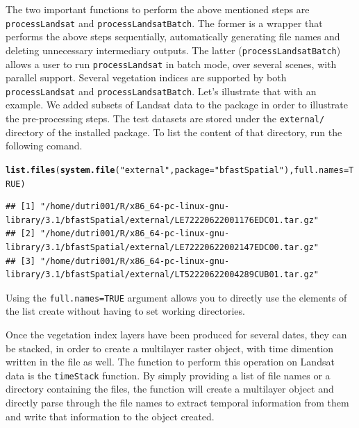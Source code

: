 \documentclass{article}\usepackage[]{graphicx}\usepackage[]{color}
\makeatletter
\newcommand{\hlnum}[1]{\textcolor[rgb]{0.686,0.059,0.569}{#1}}%
\newcommand{\hlstr}[1]{\textcolor[rgb]{0.192,0.494,0.8}{#1}}%
\newcommand{\hlstd}[1]{\textcolor[rgb]{0.345,0.345,0.345}{#1}}%
\newcommand{\hlkwc}[1]{\textcolor[rgb]{0.333,0.667,0.333}{#1}}%
\newcommand{\hlkwd}[1]{\textcolor[rgb]{0.737,0.353,0.396}{\textbf{#1}}}%
\newenvironment{kframe}{%
 \def\at@end@of@kframe{}%
 \ifinner\ifhmode%
  \def\at@end@of@kframe{\end{minipage}}%
  \begin{minipage}{\columnwidth}%
 \fi\fi%
 \def\FrameCommand##1{\hskip\@totalleftmargin \hskip-\fboxsep
 \colorbox{shadecolor}{##1}\hskip-\fboxsep
     \hskip-\linewidth \hskip-\@totalleftmargin \hskip\columnwidth}%
 \MakeFramed {\advance\hsize-\width
   \@totalleftmargin\z@ \linewidth\hsize
   \@setminipage}}%
 {\par\unskip\endMakeFramed%
 \at@end@of@kframe}
\newenvironment{knitrout}{}{} %
\def\code#1{\texttt{#1}}
\makeatother
\begin{document}
The two important functions to perform the above mentioned steps are \code{processLandsat} and \code{processLandsatBatch}. The former is a wrapper that performs the above steps sequentially, automatically generating file names and deleting unnecessary intermediary outputs. The latter (\code{processLandsatBatch}) allows a user to run \code{processLandsat} in batch mode, over several scenes, with parallel support. Several vegetation indices are supported by both \code{processLandsat} and \code{processLandsatBatch}.
Let's illustrate that with an example. We added subsets of Landsat data to the package in order to illustrate the pre-processing steps. The test datasets are stored under the \code{external/} directory of the installed package. To list the content of that directory, run the following comand.
\begin{knitrout}
\color{fgcolor}\begin{kframe}
\begin{alltt}
\hlkwd{list.files}\hlstd{(}\hlkwd{system.file}\hlstd{(}\hlstr{"external"}\hlstd{,} \hlkwc{package} \hlstd{=} \hlstr{"bfastSpatial"}\hlstd{),} \hlkwc{full.names} \hlstd{=} \hlnum{TRUE}\hlstd{)}
\end{alltt}
\begin{verbatim}
## [1] "/home/dutri001/R/x86_64-pc-linux-gnu-library/3.1/bfastSpatial/external/LE72220622001176EDC01.tar.gz"
## [2] "/home/dutri001/R/x86_64-pc-linux-gnu-library/3.1/bfastSpatial/external/LE72220622002147EDC00.tar.gz"
## [3] "/home/dutri001/R/x86_64-pc-linux-gnu-library/3.1/bfastSpatial/external/LT52220622004289CUB01.tar.gz"
\end{verbatim}
\end{kframe}
\end{knitrout}

Using the \code{full.names=TRUE} argument allows you to directly use the elements of the list create without having to set working directories.


Once the vegetation index layers have been produced for several dates, they can be stacked, in order to create a multilayer raster object, with time dimention written in the file as well. The function to perform this operation on Landsat data is the \code{timeStack} function. By simply providing a list of file names or a directory containing the files, the function will create a multilayer object and directly parse through the file names to extract temporal information from them and write that information to the object created.
\end{document}
